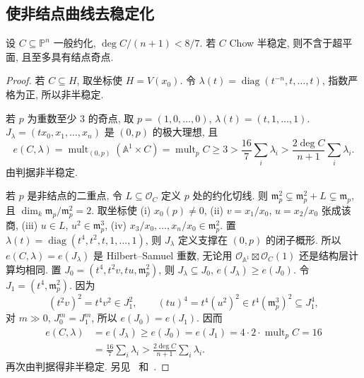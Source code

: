 \subsection{使非结点曲线去稳定化}\label{src:6.8.5-subsection}
\begin{proposition}\label{src:6.8.26}
设 $C\subseteq\mathbb P^n$ 一般约化, $\deg C/(n+1)<8/7$. 若 $C$ Chow 半稳定, 则不含于超平面, 且至多具有结点奇点.
\end{proposition}
\begin{proof}
若 $C\subseteq H$, 取坐标使 $H=V(x_0)$. 令 $\lambda(t)=\operatorname{diag}(t^{-n},\allowbreak t,\allowbreak \ldots,\allowbreak t)$, 指数严格为正, 所以非半稳定.

若 $p$ 为重数至少 $3$ 的奇点, 取 $p=(1,\allowbreak 0,\allowbreak \ldots,\allowbreak 0)$, $\lambda(t)=(t,\allowbreak 1,\allowbreak \ldots,\allowbreak 1)$. $J_\lambda=(tx_0,\allowbreak x_1,\allowbreak \ldots,\allowbreak x_n)$ 是 $(0,\allowbreak p)$ 的极大理想, 且
\[
e(C,\lambda)=\operatorname{mult}_{(0,p)}(\mathbb A^1\times C)
=\operatorname{mult}_p C\geq3>\frac{16}7\sum_i\lambda_i
>\frac{2\deg C}{n+1}\sum_i\lambda_i.
\]
由判据非半稳定.

若 $p$ 是非结点的二重点, 令 $L\subseteq\mathcal O_C$ 定义 $p$ 处的约化切线. 则 $\mathfrak m_p^2\subsetneq\mathfrak m_p^2+L\subsetneq\mathfrak m_p$, 且 $\dim_k\mathfrak m_p/\mathfrak m_p^2=2$. 取坐标使 (i) $x_0(p)\ne0$, (ii) $v=x_1/x_0$, $u=x_2/x_0$ 张成该商, (iii) $u\in L$, $u^2\in\mathfrak m_p^3$, (iv) $x_3/x_0,\allowbreak \ldots,\allowbreak x_n/x_0\in\mathfrak m_p^2$. 置 $\lambda(t)=\operatorname{diag}(t^4,\allowbreak t^2,\allowbreak t,\allowbreak 1,\allowbreak \ldots,\allowbreak 1)$, 则 $J_\lambda$ 定义支撑在 $(0,\allowbreak p)$ 的闭子概形. 所以 $e(C,\allowbreak \lambda)=e(J_\lambda)$ 是 Hilbert--Samuel 重数, 无论用 $\mathcal O_{\mathbb A^1}\boxtimes\mathcal O_C(1)$ 还是结构层计算均相同. 置 $J_0=(t^4,\allowbreak t^2v,\allowbreak tu,\allowbreak \mathfrak m_p^2)$, 则 $J_\lambda\subseteq J_0$, $e(J_\lambda)\geq e(J_0)$. 令 $J_1=(t^4,\allowbreak \mathfrak m_p^2)$. 因为
\[
(t^2v)^2=t^4v^2\in J_1^2,\qquad
(tu)^4=t^4(u^2)^2\in t^4(\mathfrak m_p^3)^2\subseteq J_1^4,
\]
对 $m\gg0$, $J_0^m=J_1^m$, 所以 $e(J_0)=e(J_1)$. 因而
\[
\begin{aligned}
e(C,\lambda)&=e(J_\lambda)\geq e(J_0)=e(J_1)
=4\cdot2\cdot\operatorname{mult}_p C=16\\
&=\frac{16}7\sum_i\lambda_i>\frac{2\deg C}{n+1}\sum_i\lambda_i.
\end{aligned}
\]
再次由判据得非半稳定. 另见~\cite[命题 3.1]{Mum77} 和~\cite[命题 1.0.4]{Gie82}.
\end{proof}
